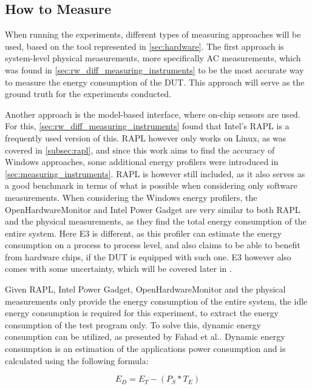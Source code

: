 \subsection{How to Measure}\label{subsec:how_to_measure}

When running the experiments, different types of measuring approaches will be used, based on the tool represented in \cref*{sec:hardware}. The first approach is system-level physical measurements, more specifically AC measurements, which was found in \cref*{sec:rw_diff_measuring_instruments} to be the most accurate way to measure the energy consumption of the DUT. This approach will serve as the ground truth for the experiments conducted.

Another approach is the model-based interface, where on-chip sensors are used. For this, \cref*{sec:rw_diff_measuring_instruments} found that Intel's RAPL is a frequently used version of this. RAPL however only works on Linux, as was covered in \cref*{subsec:rapl}, and since this work aims to find the accuracy of Windows approaches, some additional energy profilers were introduced in \cref*{sec:measuring_instruments}. RAPL is however still included, as it also serves as a good benchmark in terms of what is possible when considering only software measurements. When considering the Windows energy profilers, the OpenHardwareMonitor and Intel Power Gadget are very similar to both RAPL and the physical measurements, as they find the total energy consumption of the entire system. Here E3 is different, as this profiler can estimate the energy consumption on a process to process level, and also claims to be able to benefit from hardware chips, if the DUT is equipped with such one.\cite*{E3WinHec} E3 however also comes with some uncertainty, which will be covered later in .

Given RAPL, Intel Power Gadget, OpenHardwareMonitor and the physical measurements only provide the energy consumption of the entire system, the idle energy consumption is required for this experiment, to extract the energy consumption of the test program only. To solve this, dynamic energy consumption can be utilized, as presented by Fahad et al.\cite*[]{fahad2019comparative}. Dynamic energy consumption is an estimation of the applications power consumption and is calculated using the following formula:

\begin{equation}
    E_D = E_T -(P_S * T_E)
\end{equation}

